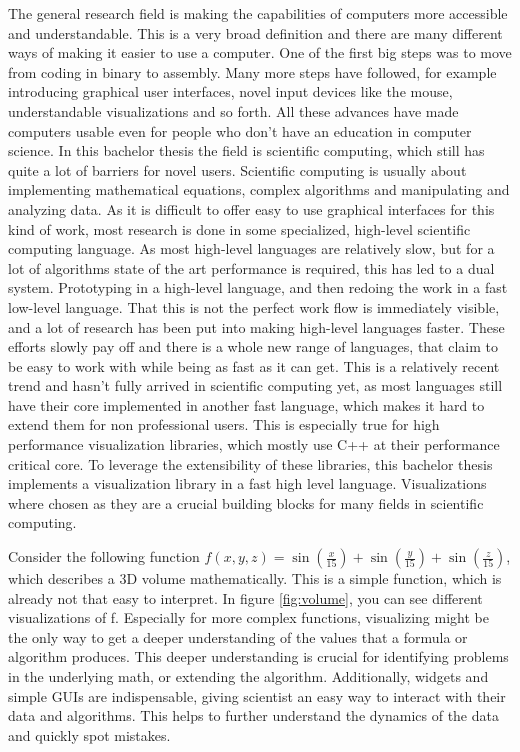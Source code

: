 The general research field is making the capabilities of computers more accessible and understandable.
This is a very broad definition and there are many different ways of making it easier to use a computer. 
One of the first big steps was to move from coding in binary to assembly. 
Many more steps have followed, for example introducing graphical user interfaces, novel input devices like the mouse, understandable visualizations and so forth.
All these advances have made computers usable even for people who don't have an education in computer science.
In this bachelor thesis the field is scientific computing, which still has quite a lot of barriers for novel users.
Scientific computing is usually about implementing mathematical equations, complex algorithms and manipulating and analyzing data.
As it is difficult to offer easy to use graphical interfaces for this kind of work, most research is done in some specialized, high-level scientific computing language. As most high-level languages are relatively slow, but for a lot of algorithms state of the art performance is required, this has led to a dual system. Prototyping in a high-level language, and then redoing the work in a fast low-level language.
That this is not the perfect work flow is immediately visible, and a lot of research has been put into making high-level languages faster.
These efforts slowly pay off and there is a whole new range of languages, that claim to be easy to work with while being as fast as it can get.
This is a relatively recent trend and hasn't fully arrived in scientific computing yet, as most languages still have their core implemented in another fast language, which makes it hard to extend them for non professional users.
This is especially true for high performance visualization libraries, which mostly use C++ at their performance critical core.
To leverage the extensibility of these libraries, this bachelor thesis implements a visualization library in a fast high level language.
Visualizations where chosen as they are a crucial building blocks for many fields in scientific computing.

Consider the following function $f(x,y,z)=\sin(\frac{x}{15})+\sin(\frac{y}{15})+\sin(\frac{z}{15})$, which describes a 3D volume mathematically. 
This is a simple function, which is already not that easy to interpret. In figure \ref{fig:volume}, you can see different visualizations of f. 
Especially for more complex functions, visualizing might be the only way to get a deeper understanding of the values that a formula or algorithm produces.
This deeper understanding is crucial for identifying problems in the underlying math, or extending the algorithm.
Additionally, widgets and simple \ac{GUI}s are indispensable, giving scientist an easy way to interact with their data and algorithms.
This helps to further understand the dynamics of the data and quickly spot mistakes.

